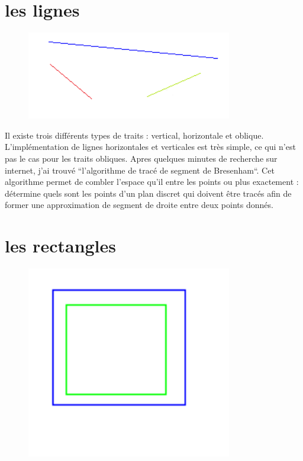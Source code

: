 \documentclass[12pt, a4paper]{report}
\begin{document}
\newpage

\section {les lignes }

\begin{figure}[!h]
\begin{center} \includegraphics[width=0.8\textwidth]{images/line.png} \end{center}
\end{figure}

Il existe trois différents types de traits : vertical, horizontale et oblique. L’implémentation de lignes horizontales et verticales est très simple, ce qui n’est pas le cas pour les traits obliques. Apres quelques minutes de recherche sur internet, j’ai trouvé “l’algorithme de tracé de segment de Bresenham“. Cet algorithme permet de combler l’espace qu’il entre les points ou plus exactement : détermine quels sont les points d’un plan discret qui doivent être tracés afin de former une approximation de segment de droite entre deux points donnés.

\newpage

\section {les rectangles}

\begin{figure}[!h]
\begin{center} \includegraphics[width=0.8\textwidth]{images/carre.png} \end{center}
\end{figure}
\end{document}
